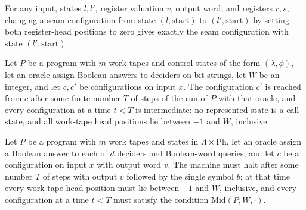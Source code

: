 \begin{lemma}
\label{Complexity.LogProg.eqCfg_aseam}
\leanok
{}
For any input, states $l,l'$, register valuation $v$, output word, and registers $r,s$,
changing a seam configuration from state $(l,\mathrm{start})$ to $(l',\mathrm{start})$
by setting both register-head positions to zero gives exactly the seam configuration
with state $(l',\mathrm{start})$.
\end{lemma}

\begin{definition}
\label{Complexity.LogProg.SimTo}
\leanok
{}
Let $P$ be a program with $m$ work tapes and control states of the form
$(\lambda,\phi)$, let an oracle assign Boolean answers to deciders on bit strings, let
$W$ be an integer, and let $c,c'$ be configurations on input $x$. The configuration $c'$
is reached from $c$ after some finite number $T$ of steps of the run of $P$ with that
oracle, and every configuration at a time $t<T$ is intermediate: no represented state is
a call state, and all work-tape head positions lie between $-1$ and $W$, inclusive.
\end{definition}

\begin{definition}
\label{Complexity.LogProg.HaltsWith}
\leanok
{}
Let $P$ be a program with $m$ work tapes and states in $\Lambda\times\mathrm{Ph}$, let
an oracle assign a Boolean answer to each of $d$ deciders and Boolean-word queries, and
let $c$ be a configuration on input $x$ with output word $v$. The machine must halt
after some number $T$ of steps with output $v$ followed by the single symbol $b$; at
that time every work-tape head position must lie between $-1$ and $W$, inclusive, and
every configuration at a time $t<T$ must satisfy the condition
$\mathrm{Mid}(P,W,\cdot)$.
\end{definition}

